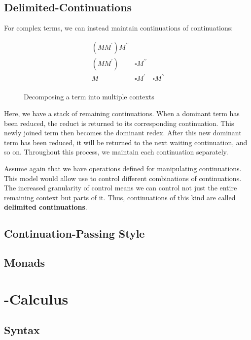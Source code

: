   \subsection{Delimited-Continuations}
 
  For complex terms, we can instead maintain continuations of continuations:
  
  \begin{figure}[!h]
    \[
    \begin{array}{lll}
      (MM^\prime) M^{\prime\prime} \\
      (MM^\prime) & \square M^{\prime\prime} \\
      M & \square M^\prime & \square M^{\prime\prime} \\
    \end{array}
    \]
  \caption{Decomposing a term into multiple contexts}
  \end{figure}

  Here, we have a stack of remaining continuations. When a dominant term
  has been reduced, the reduct is returned to its corresponding continuation. 
  This newly joined term then becomes the dominant redex. After this new 
  dominant term has been reduced, it will be returned to the next waiting 
  continuation, and so on. Throughout this process, we maintain each 
  continuation separately.
  
  Assume again that we have operations defined for manipulating continuations.
  This model would allow use to control different combinations of continuations.
  The increased granularity of control means we can control not just the
  entire remaining context but parts of it. Thus, continuations of this kind
  are called \textbf{delimited continuations}.

  
  \subsection{Continuation-Passing Style}
  \subsection{Monads}

\section{\lmu-Calculus}
  \subsection{Syntax}
